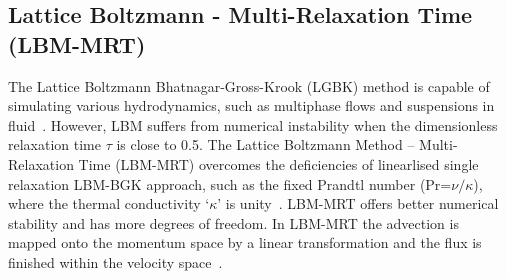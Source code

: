 \subsection{Lattice Boltzmann - Multi-Relaxation Time (LBM-MRT)}

The Lattice Boltzmann Bhatnagar-Gross-Krook (LGBK) method is capable of 
simulating various hydrodynamics, such as multiphase flows and 
suspensions in fluid~\citep{Succi1989,Succi2001}. However, LBM suffers from 
numerical instability when the dimensionless relaxation time $\tau$ is close to 
0.5. The Lattice Boltzmann Method -- Multi-Relaxation Time (LBM-MRT) overcomes 
the deficiencies of linearlised single relaxation LBM-BGK approach, such as the 
fixed Prandtl number (Pr=$\nu/\kappa$), where the thermal conductivity 
`$\kappa$' is unity~\citep{Liu2003a}. LBM-MRT offers better numerical stability 
and has more degrees of freedom. In LBM-MRT the advection is mapped onto the 
momentum space by a linear transformation and the flux is finished within the 
velocity space~\citep{Du2006}.


